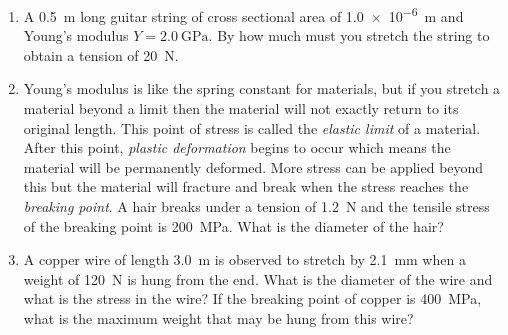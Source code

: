 \begin{enumerate}
\item
A \SI{0.5}{\meter} long guitar string of cross sectional area of \SI{1.0e-6}{\meter} and Young's modulus $Y=\SI{2.0}{\giga\pascal}$. By how much must you stretch the string to obtain a tension of \SI{20}{\newton}.

\item
Young's modulus is like the spring constant for materials, but if you stretch a material beyond a limit then the material will not exactly return to its original length. This point of stress is called the \emph{elastic limit} of a material. After this point, \emph{plastic deformation} begins to occur which means the material will be permanently deformed. More stress can be applied beyond this but the material will fracture and break when the stress reaches the \emph{breaking point}. A hair breaks under a tension of \SI{1.2}{\newton} and the tensile stress of the breaking point is \SI{200}{\mega\pascal}. What is the diameter of the hair? \bigskip

\item
A copper wire of length \SI{3.0}{\meter} is observed to stretch by \SI{2.1}{\milli\meter} when a weight of \SI{120}{\newton} is hung from the end. What is the diameter of the wire and what is the stress in the wire? If the breaking point of copper is \SI{400}{\mega\pascal}, what is the maximum weight that may be hung from this wire?





\newpage 


\end{enumerate}

